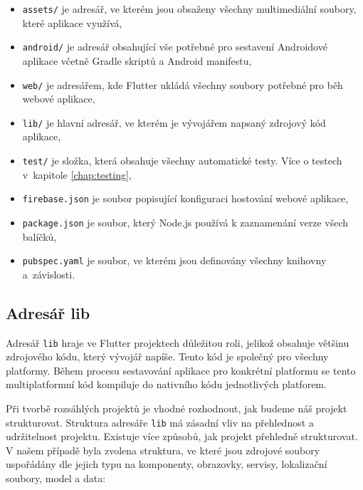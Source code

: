 \documentclass[czech, bc, kiv, he, iso690numb]{fasthesis}
\begin{document}
\begin{itemize}
    \item \texttt{assets/} je adresář, ve kterém jsou obsaženy všechny multimediální soubory, které aplikace využívá,
    \item \texttt{android/} je adresář obsahující vše potřebné pro sestavení Androidové aplikace včetně Gradle skriptů a Android manifestu,
    \item \texttt{web/} je adresářem, kde Flutter ukládá všechny soubory potřebné pro běh webové aplikace, 
    \item \texttt{lib/} je hlavní adresář, ve kterém je vývojářem napsaný zdrojový kód aplikace, 
    \item \texttt{test/} je složka, která obsahuje všechny automatické testy. Více o testech v~kapitole \ref{chap:testing},
    \item \texttt{firebase.json} je soubor popisující konfiguraci hostování webové aplikace,
    \item \texttt{package.json} je soubor, který Node.js používá k zaznamenání verze všech balíčků,
    \item \texttt{pubspec.yaml} je soubor, ve kterém jsou definovány všechny knihovny a~závislosti.
    
\end{itemize}

\subsection{Adresář lib}

Adresář \texttt{lib} hraje ve Flutter projektech důležitou roli, jelikož obsahuje většinu zdrojového kódu, který vývojář napíše. Tento kód je společný pro všechny platformy. Během procesu sestavování aplikace pro konkrétní platformu se tento multiplatformní kód kompiluje do nativního kódu jednotlivých platforem.

Při tvorbě rozsáhlých projektů je vhodné rozhodnout, jak budeme náš projekt strukturovat. Struktura adresáře \texttt{lib} má zásadní vliv na přehlednost a udržitelnost projektu. Existuje více způsobů, jak projekt přehledně strukturovat. V našem případě byla zvolena struktura, ve které jsou zdrojové soubory uspořádány dle jejich typu na komponenty, obrazovky, servisy, lokalizační soubory, model a data:
\end{document}
